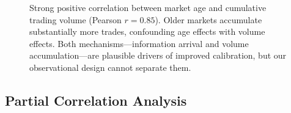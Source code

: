 \begin{figure}[h]
\centering
{}
\caption{Strong positive correlation between market age and cumulative trading volume (Pearson $r = 0.85$). Older markets accumulate substantially more trades, confounding age effects with volume effects. Both mechanisms---information arrival and volume accumulation---are plausible drivers of improved calibration, but our observational design cannot separate them.}
\label{fig:age_volume_confound}
\end{figure}

\subsection{Partial Correlation Analysis}
\label{subsec:a3_partial}

